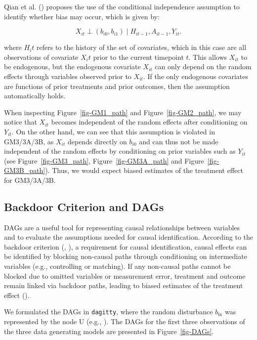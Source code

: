 \documentclass[
  12pt,
  a4paper,
]{article}
\begin{document}
Qian et al. () proposes the use of the
conditional independence assumption to identify whether bias may occur,
which is given by:

\[ X_{it} \perp (b_{i0}, b_{i1}) \mid H_{it-1}, A_{it-1}, Y_{it}. \]

where \(H_it\) refers to the history of the set of covariates, which in
this case are all observations of covariate \(X_it\) prior to the
current timepoint \(t\). This allows \(X_{it}\) to be endogenous, but
the endogenous covariate \(X_{it}\) can only depend on the random
effects through variables observed prior to \(X_{it}\). If the only
endogenous covariates are functions of prior treatments and prior
outcomes, then the assumption automatically holds.

When inspecting Figure~\ref{fig-GM1_path} and Figure~\ref{fig-GM2_path},
we may notice that \(X_{it}\) becomes independent of the random effects
after conditioning on \(Y_{it}\). On the other hand, we can see that
this assumption is violated in GM3/3A/3B, as \(X_{it}\) depends directly
on \(b_{i0}\) and can thus not be made independent of the random effects
by conditioning on prior variables such as \(Y_{it}\) (see
Figure~\ref{fig-GM3_path}, Figure~\ref{fig-GM3A_path} and
Figure~\ref{fig-GM3B_path}). Thus, we would expect biased estimates of
the treatment effect for GM3/3A/3B.

\subsection{Backdoor Criterion and
DAGs}\label{backdoor-criterion-and-dags}

DAGs are a useful tool for representing causal relationships between
variables and to evaluate the assumptions needed for causal
identification. According to the backdoor criterion
(, ),
a requirement for causal identification, causal effects can be
identified by blocking non-causal paths through conditioning on
intermediate variables (e.g., controlling or matching). If any
non-causal paths cannot be blocked due to omitted variables or
measurement error, treatment and outcome remain linked via backdoor
paths, leading to biased estimates of the treatment effect
().

We formulated the DAGs in \texttt{dagitty}, where the random disturbance
\(b_{0i}\) was represented by the node U (e.g.,
). The DAGs for the first
three observations of the three data generating models are presented in
Figure~\ref{fig-DAGs}.
\end{document}
